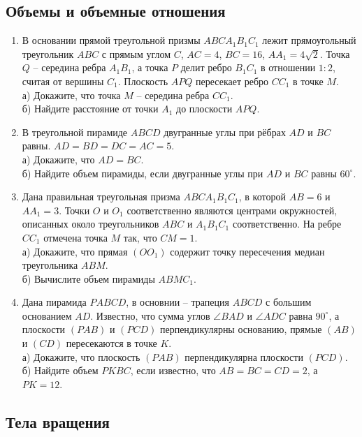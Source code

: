 \documentclass[12pt]{article}
\begin{document}
    \subsection{Объемы и объемные отношения}
    \begin{enumerate}[start=1,label={\itshape\bfseries \arabic*.}]
        \item В основании прямой треугольной призмы $ABC A_1 B_1 C_1$ лежит прямоугольный треугольник $ABC$ с прямым углом $C$, $AC = 4$, $BC = 16$, $AA_1 = 4\sqrt{2}$. Точка $Q$ -- середина ребра $A_1 B_1$, а точка $P$ делит ребро $B_1 C_1$ в отношении $1 : 2$, считая от вершины $C_1$. Плоскость $APQ$ пересекает ребро $C C_1$ в точке $M$.\\
        а) Докажите, что точка $M$ -- середина ребра $C C_1$.\\
        б) Найдите расстояние от точки $A_1$ до плоскости $APQ$.
        \item В треугольной пирамиде $ABCD$ двугранные углы при рёбрах $AD$ и $BC$ равны. $AD = BD = DC = AC = 5$.\\
        а) Докажите, что $AD = BC$.\\
        б) Найдите объем пирамиды, если двугранные углы при $AD$ и $BC$ равны $60^{\circ}$.
        \item Дана правильная треугольная призма $ABC A_1 B_1 C_1$, в которой $AB = 6$ и $A A_1 = 3$. Точки $O$ и $O_1$ соответственно являются центрами окружностей, описанных около треугольников $ABC$ и $A_1 B_1 C_1$ соответственно. На ребре $C C_1$ отмечена точка $M$ так, что $CM = 1$.\\
        а) Докажите, что прямая $(O O_1)$ содержит точку пересечения медиан треугольника $ABM$.\\
        б) Вычислите объем пирамиды $ABM C_1$.
        \item Дана пирамида $PABCD$, в основнии -- трапеция $ABCD$ с большим основанием $AD$. Известно, что сумма углов $\angle BAD$ и $\angle ADC$ равна $90^{\circ}$, а плоскости $(PAB)$ и $(PCD)$ перпендикулярны основанию, прямые $(AB)$ и $(CD)$ пересекаются в точке $K$.\\
        а) Докажите, что плоскость $(PAB)$ перпендикулярна плоскости $(PCD)$.\\
        б) Найдите объем  $PKBC$, если известно, что $AB = BC = CD = 2$, а $PK = 12$.
    \end{enumerate}

    \subsection{Тела вращения}
\end{document}
